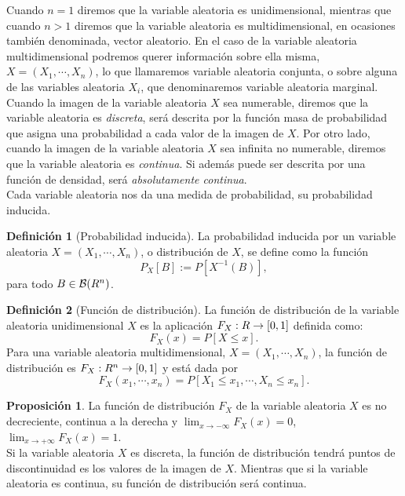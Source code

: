 \documentclass[10pt,a4paper]{article} %
\let\mathbb\relax
\theoremstyle{definition}
\newtheorem{definition}{Definición}[section]
\newtheorem{proposition}[theorem]{Proposición}
\begin{document}
Cuando $n=1$ diremos que la variable aleatoria es unidimensional, mientras que cuando $n >1$ diremos que la variable aleatoria es multidimensional, en ocasiones también denominada, vector aleatorio. En el caso de la variable aleatoria multidimensional podremos querer información sobre ella misma, $X=(X_1,\cdots, X_n)$, lo que llamaremos variable aleatoria conjunta, o sobre alguna de las variables aleatoria $X_i$, que denominaremos variable aleatoria marginal.\\

Cuando la imagen de la variable aleatoria $X$ sea numerable, diremos que la variable aleatoria es \textit{discreta}, será descrita por la función masa de probabilidad que asigna una probabilidad a cada valor de la imagen de $X$. Por otro lado, cuando la imagen de la variable aleatoria $X$ sea infinita no numerable, diremos que la variable aleatoria es \textit{continua}. Si además puede ser descrita por una función de densidad, será \textit{absolutamente continua}.\\

Cada variable aleatoria nos da una medida de probabilidad, su probabilidad inducida.

\begin{definition}[Probabilidad inducida]
  La probabilidad inducida por un variable aleatoria $X=(X_1,\cdots, X_n)$, o distribución de $X$, se define como la función \[
P_X[B]:= P[X^{-1}(B)],
  \]
para todo $B \in \mathcal{B}(\mathbb{R}^n)$.
\end{definition}

\begin{definition}[Función de distribución]
  La función de distribución de la variable aleatoria unidimensional $X$ es la aplicación $F_X:\mathbb{R}\to[0,1]$ definida como:\[
F_X(x) = P[X\leq x].
  \]
Para una variable aleatoria multidimensional,  $X=(X_1,\cdots,X_n)$, la función de distribución es $F_X:\mathbb{R}^n\to[0,1]$ y está dada por\[
F_X(x_1,\cdots,x_n) = P[X_1\leq x_1,\cdots, X_n\leq x_n].
  \]
\end{definition}


\begin{proposition}
  La función de distribución $F_X$ de la variable aleatoria $X$ es no decreciente, continua a la derecha y $\lim_{x\to - \infty}F_X(x) = 0$, $\lim_{x\to +\infty}F_X(x) = 1$.\\
  Si la variable aleatoria $X$ es discreta, la función de distribución tendrá puntos de discontinuidad es los valores de la imagen de $X$. Mientras que si la variable aleatoria es continua, su función de distribución será continua.
\end{proposition}
\end{document}
